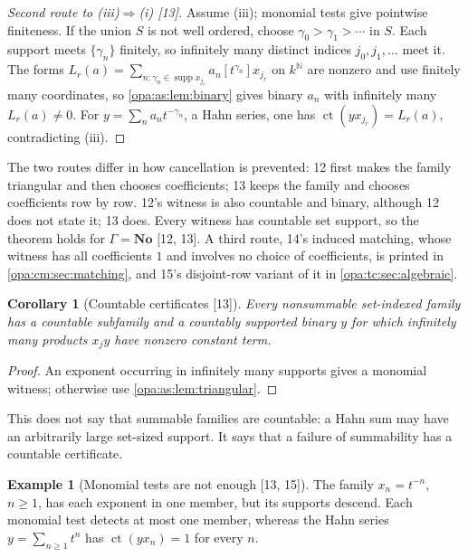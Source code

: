 \documentclass[11pt,oneside]{article}
\numberwithin{equation}{section}
\newtheorem{corollary}[corollary]{Corollary}
\theoremstyle{definition}
\newtheorem{example}[example]{Example}
\theoremstyle{remark}
\newcommand{\No}{\mathbf{No}}
\newcommand{\N}{\mathbb N}
\newcommand{\supp}{\operatorname{supp}}
\newcommand{\ct}{\operatorname{ct}}
\newcommand{\coef}[2]{[t^{#1}]#2}
\newcommand{\src}[1]{\textup{\textsf{\small[#1]}}}
\begin{document}
\begin{proof}[Second route to \textup{(iii)$\Rightarrow$(i)} \src{13}]
Assume (iii); monomial tests give pointwise finiteness. If the union $S$ is not well
ordered, choose $\gamma_0>\gamma_1>\cdots$ in $S$. Each support meets
$\{\gamma_n\}$ finitely, so infinitely many distinct indices $j_0,j_1,\ldots$ meet it. The
forms $L_r(a)=\sum_{n:\gamma_n\in\supp x_{j_r}}a_n\coef{\gamma_n}{x_{j_r}}$ on $k^\N$ are
nonzero and use finitely many coordinates, so \cref{opa:as:lem:binary} gives binary $a_n$
with infinitely many $L_r(a)\ne0$. For $y=\sum_na_nt^{-\gamma_n}$, a Hahn series, one has
$\ct(yx_{j_r})=L_r(a)$, contradicting (iii).
\end{proof}

The two routes differ in how cancellation is prevented: 12 first makes the family
triangular and then chooses coefficients; 13 keeps the family and chooses coefficients
row by row. 12's witness is also countable and binary, although 12 does not state it;
13 does. Every witness has countable set support, so the theorem holds for
$\Gamma=\No$ \src{12, 13}. A third route, 14's induced matching, whose witness has all
coefficients $1$ and involves no choice of coefficients, is printed in
\cref{opa:cm:sec:matching}, and 15's disjoint-row variant of it in
\cref{opa:tc:sec:algebraic}.

\begin{corollary}[Countable certificates \src{13}]\label{opa:as:cor:countable}
Every nonsummable set-indexed family has a countable subfamily and a countably supported
binary $y$ for which infinitely many products $x_jy$ have nonzero constant term.
\end{corollary}
\begin{proof}
An exponent occurring in infinitely many supports gives a monomial witness; otherwise use
\cref{opa:as:lem:triangular}.
\end{proof}

This does not say that summable families are countable: a Hahn sum may have an arbitrarily
large set-sized support. It says that a failure of summability has a countable
certificate.

\begin{example}[Monomial tests are not enough \src{13, 15}]\label{opa:as:ex:monomialtests}
The family $x_n=t^{-n}$, $n\ge1$, has each exponent in one member, but its supports
descend. Each monomial test detects at most one member, whereas the Hahn series
$y=\sum_{n\ge1}t^n$ has $\ct(yx_n)=1$ for every $n$.
\end{example}
\end{document}
